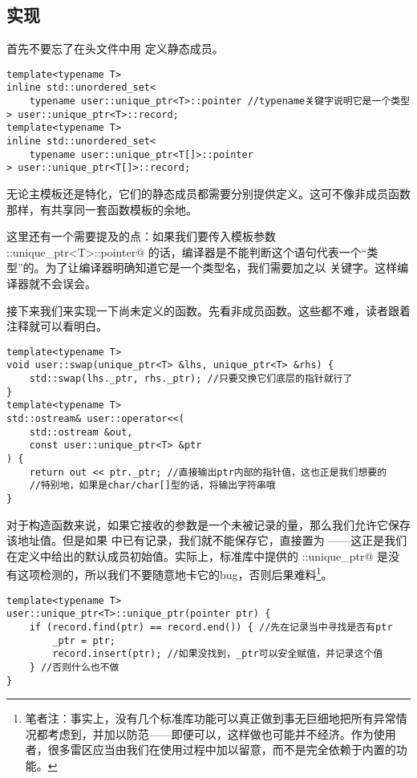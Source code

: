 \subsection*{实现}
首先不要忘了在头文件中用 \lstinline@inline@ 定义静态成员。
\begin{lstlisting}
template<typename T>
inline std::unordered_set<
    typename user::unique_ptr<T>::pointer //typename关键字说明它是一个类型
> user::unique_ptr<T>::record;
template<typename T>
inline std::unordered_set<
    typename user::unique_ptr<T[]>::pointer
> user::unique_ptr<T[]>::record;
\end{lstlisting}
无论主模板还是特化，它们的静态成员都需要分别提供定义。这可不像非成员函数那样，有共享同一套函数模板的余地。\par
这里还有一个需要提及的点：如果我们要传入模板参数 \lstinline@user::unique_ptr<T>::pointer@ 的话，编译器是不能判断这个语句代表一个``类型''的。为了让编译器明确知道它是一个类型名，我们需要加之以 \lstinline@typename@ 关键字。这样编译器就不会误会。\par\pagebreak
接下来我们来实现一下尚未定义的函数。先看非成员函数。这些都不难，读者跟着注释就可以看明白。
\begin{lstlisting}
template<typename T>
void user::swap(unique_ptr<T> &lhs, unique_ptr<T> &rhs) {
    std::swap(lhs._ptr, rhs._ptr); //只要交换它们底层的指针就行了
}
template<typename T>
std::ostream& user::operator<<(
    std::ostream &out,
    const user::unique_ptr<T> &ptr
) {
    return out << ptr._ptr; //直接输出ptr内部的指针值，这也正是我们想要的
    //特别地，如果是char/char[]型的话，将输出字符串哦
}
\end{lstlisting}
对于构造函数来说，如果它接收的参数是一个未被记录的量，那么我们允许它保存该地址值。但是如果 \lstinline@record@ 中已有记录，我们就不能保存它，直接置为 ——这正是我们在定义中给出的默认成员初始值。实际上，标准库中提供的 \lstinline@std::unique_ptr@ 是没有这项检测的，所以我们不要随意地卡它的bug，否则后果难料\footnote{笔者注：事实上，没有几个标准库功能可以真正做到事无巨细地把所有异常情况都考虑到，并加以防范——即便可以，这样做也可能并不经济。作为使用者，很多雷区应当由我们在使用过程中加以留意，而不是完全依赖于内置的功能。}。
\begin{lstlisting}
template<typename T>
user::unique_ptr<T>::unique_ptr(pointer ptr) {
    if (record.find(ptr) == record.end()) { //先在记录当中寻找是否有ptr
        _ptr = ptr;
        record.insert(ptr); //如果没找到，_ptr可以安全赋值，并记录这个值
    } //否则什么也不做
}
\end{lstlisting}\par
